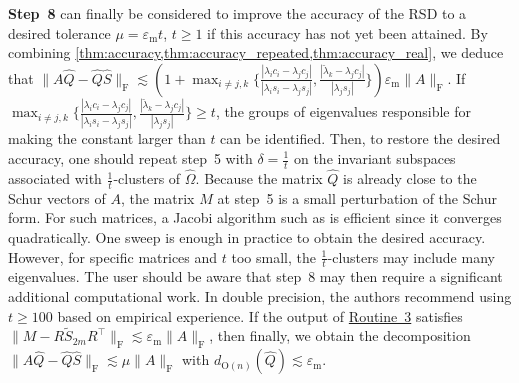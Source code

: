 \documentclass[10pt,twoside,dvipsnames]{siamart1116}
\numberwithin{algorithm}{section}
\numberwithin{equation}{section}
\newcommand{\wordref}[2]{\hyperlink{#1}{#2}}
\newcommand{\new}[1]{#1}
\begin{document}
	\new{\textbf{Step~8} can finally be considered to improve the accuracy of the RSD to a desired tolerance $\mu =\varepsilon_\mathrm{m} t$, $t\geq 1$ if this accuracy has not yet been attained. By combining \cref{thm:accuracy,thm:accuracy_repeated,thm:accuracy_real}, we deduce that $\|A\widehat{Q} -\widehat{Q}\widehat{S}\|_\mathrm{F}\lesssim \left(1+ \max_{i\neq j, k}\{\frac{|\lambda_i c_i - \lambda_j c_j|}{|\lambda_i s_i - \lambda_j s_j|},\frac{|\breve{\lambda}_k - \lambda_j c_j|}{| \lambda_j s_j|}\}\right)\varepsilon_\mathrm{m} \|A\|_\mathrm{F}$. If $\max_{i\neq j, k}\{\frac{|\lambda_i c_i - \lambda_j c_j|}{|\lambda_i s_i - \lambda_j s_j|},\frac{|\breve{\lambda}_k - \lambda_j c_j|}{| \lambda_j s_j|}\}\geq t$, the groups of eigenvalues responsible for making the constant larger than $t$ can be identified. Then, to restore the desired accuracy, one should repeat step~5 with $\delta=\frac{1}{t}$ on the invariant subspaces associated with $\frac{1}{t}$-clusters of $\widehat{\Omega}$. Because the matrix $\widehat{Q}$ is already close to the Schur vectors of $A$, the matrix $M$ at step~5 is a small perturbation of the Schur form. For such matrices, a Jacobi algorithm such as \cite{ZhouBrent03} is efficient since it converges quadratically. One sweep is enough in practice to obtain the desired accuracy. However, for specific matrices and $t$ too small, the $\frac{1}{t}$-clusters may include many eigenvalues. The user should be aware that step~8 may then require a significant additional computational work. In double precision, the authors recommend using $t\geq 100$ based on empirical experience. If the output of \wordref{oracle3}{Routine~3} satisfies $\|M - R \widetilde{S}_{2m} R^\top\|_\mathrm{F}\lesssim \varepsilon_\mathrm{m} \|A\|_\mathrm{F}$, then finally, we obtain the decomposition $\|A\widehat{Q}-\widehat{Q}\widehat{S}\|_\mathrm{F}\lesssim\mu \|A\|_\mathrm{F}$ with $d_{\mathrm{O}(n)}(\widehat{Q})\lesssim \varepsilon_\mathrm{m}$.} %
\end{document}
